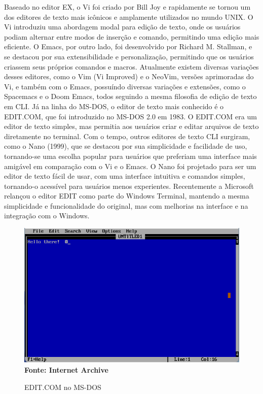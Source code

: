 Baseado no editor EX, o Vi foi criado por Bill Joy e rapidamente se tornou um dos editores de texto mais icônicos e amplamente utilizados no mundo UNIX.
O Vi introduziu uma abordagem modal para edição de texto, onde os usuários podiam alternar entre modos de inserção e comando, permitindo uma edição mais
eficiente. O Emacs, por outro lado, foi desenvolvido por Richard M. Stallman, e se destacou por sua extensibilidade e personalização, permitindo que os
usuários criassem seus próprios comandos e macros. Atualmente existem diversas variações desses editores, como o Vim (Vi Improved) e o NeoVim, versões
aprimoradas do Vi, e também com o Emacs, possuíndo diversas variações e extensões, como o Spacemacs e o Doom Emacs, todos seguindo a mesma filosofia de edição
de texto em CLI. Já na linha do MS-DOS, o editor de texto mais conhecido é o EDIT.COM, que foi introduzido no MS-DOS 2.0 em 1983. O EDIT.COM era um editor de
texto simples, mas permitia aos usuários criar e editar arquivos de texto diretamente no terminal. Com o tempo, outros editores de texto CLI surgiram, como o
Nano (1999), que se destacou por sua simplicidade e facilidade de uso, tornando-se uma escolha popular para usuários que preferiam uma interface mais amigável
em comparação com o Vi e o Emacs. O Nano foi projetado para ser um editor de texto fácil de usar, com uma interface intuitiva e comandos simples, tornando-o
acessível para usuários menos experientes. Recentemente a Microsoft relançou o editor EDIT como parte do Windows Terminal, mantendo a mesma
simplicidade e funcionalidade do original, mas com melhorias na interface e na integração com o Windows.

\FloatBarrier
\begin{figure}[!htbp]
	\centering
	\caption{EDIT.COM no MS-DOS}
	\includegraphics[scale=0.8]{imagens/EDIT_MSDOS}
	\\\textbf{Fonte: Internet Archive}
	\label{fig:EDIT_MSDOS}
\end{figure}
\FloatBarrier

